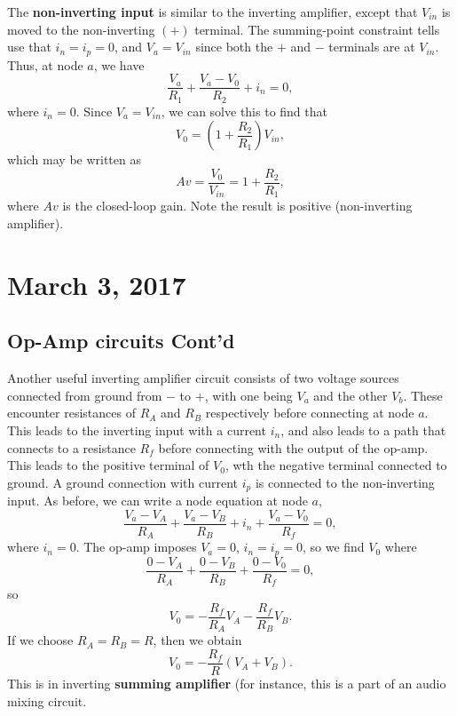 \documentclass[11pt]{article}
\theoremstyle{plain} %
\theoremstyle{definition}
\theoremstyle{example}
\theoremstyle{remark}
\begin{document}
The \textbf{non-inverting input} is similar to the inverting amplifier, except that $V_{in}$ is moved to the non-inverting $(+)$ terminal. The summing-point constraint tells use that $i_n=i_p = 0$, and $V_a = V_{in}$ since both the $+$ and $-$ terminals are at $V_{in}$. Thus, at node $a$, we have 
$$\frac{V_a}{R_1} + \frac{V_a-V_0}{R_2} + i_n = 0,$$
where $i_n=0$. Since $V_a=V_{in}$, we can solve this to find that 
$$V_0 = \left(1+\frac{R_2}{R_1}\right)V_{in},$$
which may be written as 
$$Av = \frac{V_0}{V_{in}} = 1+\frac{R_2}{R_1},$$
where $Av$ is the closed-loop gain. Note the result is positive (non-inverting amplifier). 


\section{March 3, 2017}
\subsection{Op-Amp circuits Cont'd}

Another useful inverting amplifier circuit consists of two voltage sources connected from ground from $-$ to $+$, with one being $V_a$ and the other $V_b$. These encounter resistances of $R_A$ and $R_B$ respectively before connecting at node $a$. This leads to the inverting input with a current $i_n$, and also leads to a path that connects to a resistance $R_f$ before connecting with the output of the op-amp. This leads to the positive terminal of $V_0$, wth the negative terminal connected to ground. A ground connection with current $i_p$ is connected to the non-inverting input. As before, we can write a node equation at node $a$,
$$\frac{V_a-V_A}{R_A} + \frac{V_a-V_B}{R_B} + i_n + \frac{V_a-V_0}{R_f} = 0,$$
where $i_n=0$. The op-amp imposes $V_a = 0$, $i_n=i_p=0$, so we find $V_0$ where 
$$\frac{0-V_A}{R_A} + \frac{0-V_B}{R_B}  + \frac{0-V_0}{R_f} = 0,$$
so $$V_0 = -\frac{R_f}{R_A}V_A-\frac{R_f}{R_B}V_B.$$
If we choose $R_A = R_B = R$, then we obtain 
$$V_0 = -\frac{R_f}{R}(V_A+V_B).$$
This is in inverting \textbf{summing amplifier} (for instance, this is a part of an audio mixing circuit. 
\end{document}
